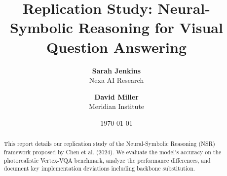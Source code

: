 \documentclass[11pt,a4paper]{article}
\title{\color{primarycolor}\bfseries Replication Study: Neural-Symbolic Reasoning for Visual Question Answering}
\author{\textbf{Sarah Jenkins} \\ Nexa AI Research \and \textbf{David Miller} \\ Meridian Institute}
\date{\today}
\begin{document}
\maketitle

\begin{abstract}
This report details our replication study of the Neural-Symbolic Reasoning (NSR) framework proposed by Chen et al. (2024). We evaluate the model's accuracy on the photorealistic Vertex-VQA benchmark, analyze the performance differences, and document key implementation deviations including backbone substitution.
\end{abstract}








\end{document}
